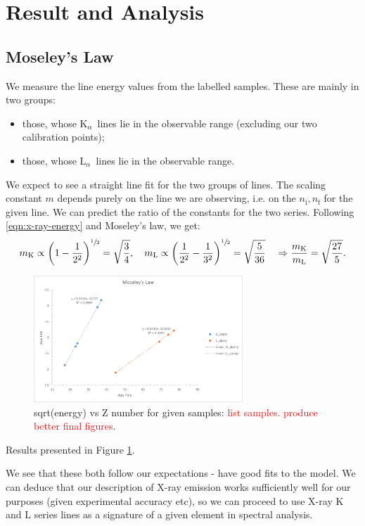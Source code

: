 \documentclass[11pt,a4paper,twoside,onecolumn]{article}
\newcommand{\reminder}[1]{\textcolor{red}{#1}}
\newcommand{\Kalpha}{$\mathrm{K}_\alpha$~}
\newcommand{\Lalpha}{$\mathrm{L}_\alpha$~}
\begin{document}
\section{Result and Analysis}

\subsection{Moseley's Law}
We measure the line energy values from the labelled samples. These are mainly in two groups:
\begin{itemize}[noitemsep]
    \item those, whose \Kalpha lines lie in the observable range (excluding our two calibration points);
    \item those, whose \Lalpha lines lie in the observable range.
\end{itemize}
We expect to see a straight line fit for the two groups of lines. The scaling constant $m$ depends purely on the line we are observing, i.e. on the $n_\mathrm{i}, n_\mathrm{f}$ for the given line. We can predict the ratio of the constants for the two series. Following \eqref{eqn:x-ray-energy} and Moseley's law, we get:
\begin{equation}
    m_\mathrm{K} \propto \left(1 - \frac{1}{2^2}\right)^{\sfrac{1}{2}} = \sqrt{\frac{3}{4}},\quad m_\mathrm{L} \propto \left(\frac{1}{2^2} - \frac{1}{3^2}\right)^{\sfrac{1}{2}} = \sqrt{\frac{5}{36}} \quad \Rightarrow \frac{m_\mathrm{K}}{m_\mathrm{L}} = \sqrt{\frac{27}{5}}.
\end{equation}
\begin{figure}[!htbp]
    \centering
    \includegraphics[width=0.7\textwidth]{img/moseleys.png}
    \caption{sqrt(energy) vs Z number for given samples: \reminder{list samples. produce better final figures}.}\label{fig:moseleys}
\end{figure}
Results presented in Figure \ref{fig:moseleys}.

We see that these both follow our expectations - have good fits to the model. We can deduce that our description of X-ray emission works sufficiently well for our purposes (given experimental accuracy etc), so we can proceed to use X-ray K and L series lines as a signature of a given element in spectral analysis.
\end{document}
